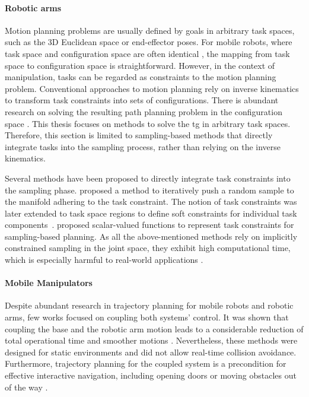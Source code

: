 \paragraph{Robotic arms}%

Motion planning problems are usually defined by goals in
arbitrary task spaces, such as the 3D Euclidean space or
end-effector poses. For mobile robots, where task space and
configuration space are often identical \cite{LaValle2006},
the mapping from task space to configuration space is
straightforward. However, in the context of manipulation,
tasks can be regarded as constraints to the motion planning
problem. Conventional approaches to motion planning rely on
inverse kinematics to transform task constraints into sets
of configurations. There is abundant research on
solving the resulting path planning problem in the
configuration space \cite{LaValle2006,Rickert2014}. This
thesis focuses on methods to solve the \ac{tg} in arbitrary
task spaces. Therefore, this section is limited to
sampling-based methods that directly integrate tasks into
the sampling process, rather than relying on the inverse
kinematics.

Several methods have been proposed to
directly integrate task constraints into the sampling phase.
\cite{Stilman2010} proposed a method to iteratively push a
random sample to the manifold adhering to the task
constraint. The notion of task constraints was later
extended to task space regions to define soft constraints
for individual task components~\cite{Berenson2011}.
\cite{Kingston2019} proposed scalar-valued functions to
represent task constraints for sampling-based planning. As
all the above-mentioned methods rely on implicitly
constrained sampling in the joint space, they exhibit high
computational time, which is especially harmful to
real-world applications \cite{qureshi2021constrained}.

\paragraph{Mobile Manipulators}

Despite abundant research in trajectory planning for mobile robots and robotic
arms, few works focused on coupling both systems' control. It was shown that
coupling the base and the robotic arm motion leads to a considerable reduction
of total operational time and smoother motions \cite{Thakar2018, Thakar2019}.
Nevertheless, these methods were designed for static environments and did not
allow real-time collision avoidance. Furthermore, trajectory planning for the
coupled system is a precondition for effective interactive navigation, including
opening doors \cite{Jain2009, Chitta2010} or moving obstacles out of the way
\cite{Li2019}.


